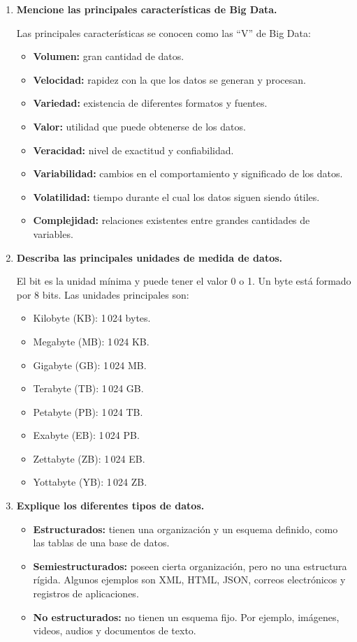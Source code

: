 \begin{enumerate}
\item \textbf{Mencione las principales características de Big Data.}

Las principales características se conocen como las ``V'' de Big Data:

\begin{itemize}
    \item \textbf{Volumen:} gran cantidad de datos.
    \item \textbf{Velocidad:} rapidez con la que los datos se generan y procesan.
    \item \textbf{Variedad:} existencia de diferentes formatos y fuentes.
    \item \textbf{Valor:} utilidad que puede obtenerse de los datos.
    \item \textbf{Veracidad:} nivel de exactitud y confiabilidad.
    \item \textbf{Variabilidad:} cambios en el comportamiento y significado de los datos.
    \item \textbf{Volatilidad:} tiempo durante el cual los datos siguen siendo útiles.
    \item \textbf{Complejidad:} relaciones existentes entre grandes cantidades de variables.
\end{itemize}

\item \textbf{Describa las principales unidades de medida de datos.}

El bit es la unidad mínima y puede tener el valor 0 o 1. Un byte está formado por 8 bits. Las unidades principales son:

\begin{itemize}
    \item Kilobyte (KB): 1\,024 bytes.
    \item Megabyte (MB): 1\,024 KB.
    \item Gigabyte (GB): 1\,024 MB.
    \item Terabyte (TB): 1\,024 GB.
    \item Petabyte (PB): 1\,024 TB.
    \item Exabyte (EB): 1\,024 PB.
    \item Zettabyte (ZB): 1\,024 EB.
    \item Yottabyte (YB): 1\,024 ZB.
\end{itemize}

\item \textbf{Explique los diferentes tipos de datos.}

\begin{itemize}
    \item \textbf{Estructurados:} tienen una organización y un esquema definido, como las tablas de una base de datos.
    \item \textbf{Semiestructurados:} poseen cierta organización, pero no una estructura rígida. Algunos ejemplos son XML, HTML, JSON, correos electrónicos y registros de aplicaciones.
    \item \textbf{No estructurados:} no tienen un esquema fijo. Por ejemplo, imágenes, videos, audios y documentos de texto.
\end{itemize}


\end{enumerate}
